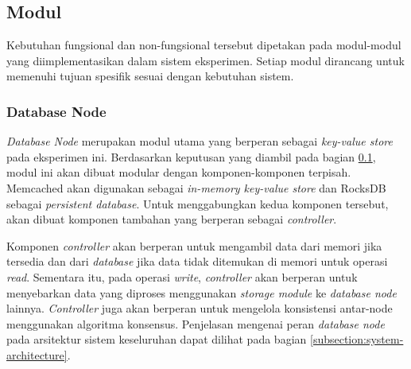 \begin{table}[h]
\centering
\caption{Kebutuhan Non-Fungsional}
\end{table}

\subsection{Modul}
\label{subsection:modules}

Kebutuhan fungsional dan non-fungsional tersebut dipetakan pada modul-modul yang diimplementasikan dalam sistem eksperimen. Setiap modul dirancang untuk memenuhi tujuan spesifik sesuai dengan kebutuhan sistem.

\subsubsection{Database Node}
\label{subsubsection:database-node}

\textit{Database Node} merupakan modul utama yang berperan sebagai \textit{key-value store} pada eksperimen ini. Berdasarkan keputusan yang diambil pada bagian \ref{subsection:modules}, modul ini akan dibuat modular dengan komponen-komponen terpisah. Memcached akan digunakan sebagai \textit{in-memory key-value store} dan RocksDB sebagai \textit{persistent database}. Untuk menggabungkan kedua komponen tersebut, akan dibuat komponen tambahan yang berperan sebagai \textit{controller}.

Komponen \textit{controller} akan berperan untuk mengambil data dari memori jika tersedia dan dari \textit{database} jika data tidak ditemukan di memori untuk operasi \textit{read}. Sementara itu, pada operasi \textit{write}, \textit{controller} akan berperan untuk menyebarkan data yang diproses menggunakan \textit{storage module} ke \textit{database node} lainnya. \textit{Controller} juga akan berperan untuk mengelola konsistensi antar-node menggunakan algoritma konsensus. Penjelasan mengenai peran \textit{database node} pada arsitektur sistem keseluruhan dapat dilihat pada bagian \ref{subsection:system-architecture}.

